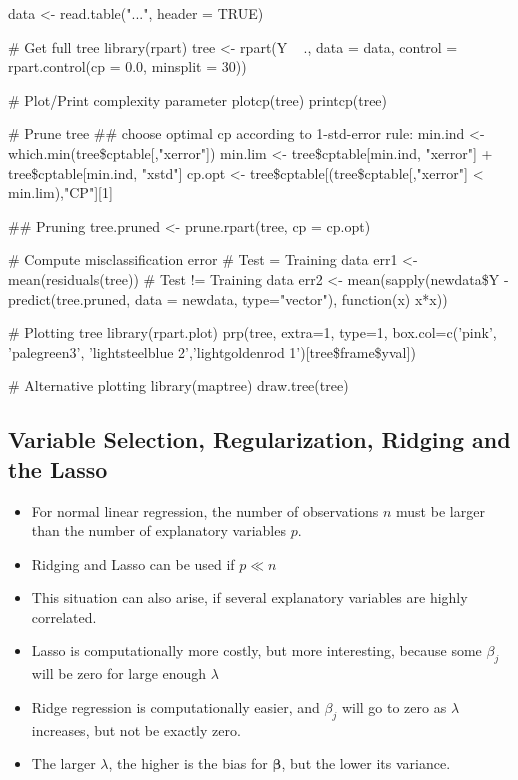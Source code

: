 \begin{code}
 data <- read.table("...", header = TRUE)
 
 # Get full tree
 library(rpart)
 tree <- rpart(Y ~ ., data = data, control = rpart.control(cp = 0.0, minsplit = 30))
 
 # Plot/Print complexity parameter
 plotcp(tree)
 printcp(tree)
 
 # Prune tree
 ## choose optimal cp according to 1-std-error rule:
 min.ind <- which.min(tree\$cptable[,"xerror"])
 min.lim <- tree\$cptable[min.ind, "xerror"] + tree\$cptable[min.ind, "xstd"]
 cp.opt <- tree\$cptable[(tree\$cptable[,"xerror"] < min.lim),"CP"][1]
 
 ## Pruning
 tree.pruned <- prune.rpart(tree, cp = cp.opt)
 
 # Compute misclassification error
 # Test = Training data
 err1 <- mean(residuals(tree))
 # Test != Training data
 err2 <- mean(sapply(newdata\$Y - predict(tree.pruned, data = newdata, type="vector"), function(x) x*x))
 
 # Plotting tree
 library(rpart.plot)
 prp(tree, extra=1, type=1, 
   box.col=c('pink', 'palegreen3', 
             'lightsteelblue 2','lightgoldenrod 1')[tree\$frame\$yval])

 # Alternative plotting
 library(maptree)
 draw.tree(tree)
\end{code}

\subsection{Variable Selection, Regularization, Ridging and the Lasso}
\begin{application}
 \begin{itemize}
  \item For normal linear regression, the number of observations $n$ must be larger than the number of explanatory variables $p$.
  \item Ridging and Lasso can be used if $p \ll n$
  \item This situation can also arise, if several explanatory variables are highly correlated.
  \item Lasso is computationally more costly, but more interesting, because some $\beta_j$ will be zero for large enough $\lambda$
  \item Ridge regression is computationally easier, and $\beta_j$ will go to zero as $\lambda$ increases, but not be exactly zero.
  \item The larger $\lambda$, the higher is the bias for $\boldsymbol{\beta}$, but the lower its variance.
 \end{itemize}
\end{application}

